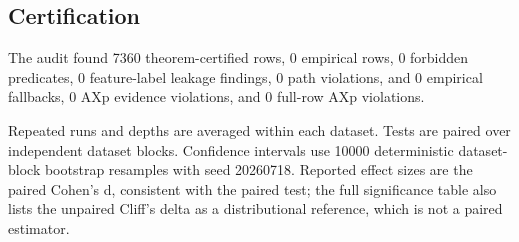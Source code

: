 \documentclass[10pt]{article}
\begin{document}
\subsection*{Certification}
The audit found 7360 theorem-certified rows, 0 empirical rows, 0 forbidden predicates, 0 feature-label leakage findings, 0 path violations, and 0 empirical fallbacks, 0 AXp evidence violations, and 0 full-row AXp violations.

Repeated runs and depths are averaged within each dataset. Tests are paired
over independent dataset blocks. Confidence intervals use
10000 deterministic dataset-block bootstrap resamples with seed
20260718. Reported effect sizes are the paired Cohen's d, consistent with the
paired test; the full significance table also lists the unpaired Cliff's delta as
a distributional reference, which is not a paired estimator.
\end{document}
